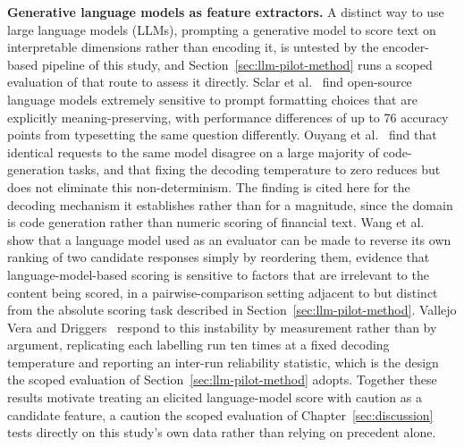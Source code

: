 \documentclass[logo,msc,ai]{infthesis}        %
\begin{document}
\textbf{Generative language models as feature extractors.} A distinct way to use large language models (LLMs), prompting a generative model to score text on interpretable dimensions rather than encoding it, is untested by the encoder-based pipeline of this study, and Section~\ref{sec:llm-pilot-method} runs a scoped evaluation of that route to assess it directly. Sclar et al.\ \cite{sclar2024quantifying} find open-source language models extremely sensitive to prompt formatting choices that are explicitly meaning-preserving, with performance differences of up to 76 accuracy points from typesetting the same question differently. Ouyang et al.\ \cite{ouyang2025empirical} find that identical requests to the same model disagree on a large majority of code-generation tasks, and that fixing the decoding temperature to zero reduces but does not eliminate this non-determinism. The finding is cited here for the decoding mechanism it establishes rather than for a magnitude, since the domain is code generation rather than numeric scoring of financial text. Wang et al.\ \cite{wang2024large} show that a language model used as an evaluator can be made to reverse its own ranking of two candidate responses simply by reordering them, evidence that language-model-based scoring is sensitive to factors that are irrelevant to the content being scored, in a pairwise-comparison setting adjacent to but distinct from the absolute scoring task described in Section~\ref{sec:llm-pilot-method}. Vallejo Vera and Driggers~\cite{vallejo2025llms} respond to this instability by measurement rather than by argument, replicating each labelling run ten times at a fixed decoding temperature and reporting an inter-run reliability statistic, which is the design the scoped evaluation of Section~\ref{sec:llm-pilot-method} adopts. Together these results motivate treating an elicited language-model score with caution as a candidate feature, a caution the scoped evaluation of Chapter~\ref{sec:discussion} tests directly on this study's own data rather than relying on precedent alone.
\end{document}
